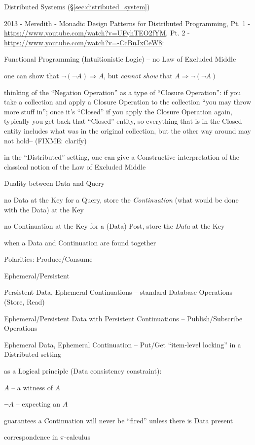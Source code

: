 \fist Distributed Systems (\S\ref{sec:distributed_system})

\asterism

2013 - Meredith - Monadic Design Patterns for Distributed Programming, Pt. 1 -
\url{https://www.youtube.com/watch?v=UFyhTEO2fYM}, Pt. 2 -
\url{https://www.youtube.com/watch?v=-CcBuJxCeW8}:

Functional Programming (Intuitionistic Logic) -- no Law of Excluded Middle

one can show that $\neg(\neg A) \Rightarrow A$, but \emph{cannot show} that
$A \Rightarrow \neg(\neg A)$

thinking of the ``Negation Operation'' as a type of ``Closure Operation'': if
you take a collection and apply a Closure Operation to the collection ``you may
throw more stuff in''; once it's ``Closed'' if you apply the Closure Operation
again, typically you get back that ``Closed'' entity, so everything that is in
the Closed entity includes what was in the original collection, but the other
way around may not hold-- (FIXME: clarify)

in the ``Distributed'' setting, one can give a Constructive interpretation of
the classical notion of the Law of Excluded Middle

Duality between Data and Query

no Data at the Key for a Query, store the \emph{Continuation} (what would be
done with the Data) at the Key

no Continuation at the Key for a (Data) Post, store the \emph{Data} at the Key

when a Data and Continuation are found together

Polarities: Produce/Consume

Ephemeral/Persistent

Persistent Data, Ephemeral Continuations -- standard Database Operations (Store,
Read)

Ephemeral/Persistent Data with Persistent Continuations -- Publish/Subscribe
Operations

Ephemeral Data, Ephemeral Continuation -- Put/Get ``item-level locking'' in a
Distributed setting

as a Logical principle (Data consistency constraint):

$A$ -- a witness of $A$

$\neg A$ -- expecting an $A$

guarantees a Continuation will never be ``fired'' unless there is Data present

correspondence in $\pi$-calculus

